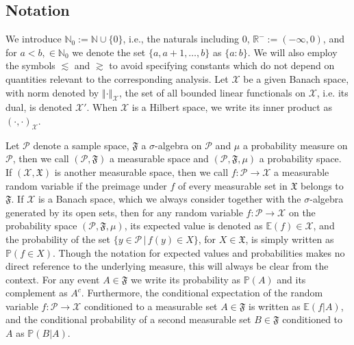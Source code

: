 \documentclass{article}
\newcommand{\cP}{\mathcal{P}}
\newcommand{\cX}{\mathcal{X}}
\newcommand{\fF}{\mathfrak{F}}
\newcommand{\fX}{\mathfrak{X}}
\newcommand{\IE}{\mathbb{E}}
\newcommand{\IN}{\mathbb{N}}
\newcommand{\IP}{\mathbb{P}}
\newcommand{\IR}{\mathbb{R}}
\newcommand{\pr}[3]{\left(#2, #3\right)_{#1}}
\newcommand{\norm}[2]{{\left\Vert #2 \right\Vert}_{#1}}
\newcommand{\probspace}{\cP, \fF, \mu}
\newcommand{\probspacepar}{(\probspace )}
\theoremstyle{definition}
\begin{document}
\subsection{Notation}
\label{ssec:not}
We introduce $\IN_0:=\IN\cup \{0\}$, i.e., the naturals including $0$, $\IR^{-}:=(-\infty,0)$, and
for $a<b, \in \IN_0$ we denote the set $\{a,a+1,\hdots, b \}$ as $\{a : b\}$.
We will also employ the symbols $\lesssim$ and $\gtrsim$ to avoid specifying constants which do not depend on quantities
relevant to the corresponding analysis. 
Let $\cX$ be a given Banach space, with norm denoted by $\norm{\cX}{\cdot}$, the set of all bounded linear
functionals on $\cX$, i.e. its dual, is denoted $\cX'$. When $\cX$ is a Hilbert space, we write its
inner product as $\pr{\cX}{\cdot}{\cdot}$.

Let $\cP$ denote a sample space, $\fF$ a $\sigma$-algebra on $\cP$ and $\mu$
a probability measure on $\cP$, then we call $(\cP, \fF)$ a measurable space and
$(\cP, \fF, \mu)$ a probability space. If $(\cX,\fX)$ is another measurable space, then we call $f
:\cP\to\cX$
a measurable random variable if the preimage under $f$ of every measurable set in $\fX$
belongs to $\fF$. If $\cX$ is a Banach space, which we always consider
together with the $\sigma$-algebra generated by its open sets, then for any random variable $f:\cP\to\cX$
on the probability space $\probspacepar$, its expected value is denoted as $\IE(f)\in\cX$,
and the probability of the set $\{y\in\cP\,\vert\, f(y)\in X\}$, for $X\in\fX$, is simply written as $\IP(f\in X)$.
Though the notation for expected values and probabilities makes no direct reference to the underlying measure, this will always be clear from the context. For any event
$A\in\fF$ we write its probability as $\IP(A)$ and its complement as $A^c$. Furthermore, the
 conditional expectation of the random variable $f:\cP\to\cX$ conditioned to a measurable set $A\in\fF$
is written as $\IE(f\vert A)$, and the conditional probability of a second measurable set $B\in\fF$ conditioned
to $A$ as $\IP(B\vert A)$.
\end{document}
